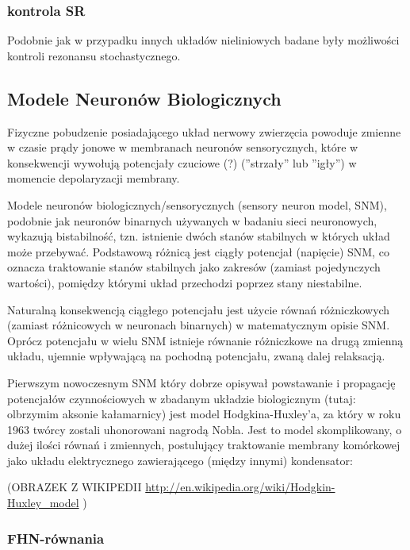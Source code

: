 \documentclass[12pt]{article}
\begin{document}
  \subsubsection{kontrola SR}
  
  Podobnie jak w przypadku innych układów nieliniowych badane były możliwości kontroli rezonansu stochastycznego. \cite{gammaitoni}
  
  \subsection{Modele Neuronów Biologicznych}
  
  Fizyczne pobudzenie posiadającego układ nerwowy zwierzęcia powoduje zmienne w czasie prądy jonowe w membranach neuronów sensorycznych, które w konsekwencji wywołują potencjały czuciowe (?) (''strzały'' lub ''igły'') w momencie depolaryzacji membrany.
  
  Modele neuronów biologicznych/sensorycznych (sensory neuron model, SNM), podobnie jak neuronów binarnych używanych w badaniu sieci neuronowych, wykazują bistabilność, tzn. istnienie dwóch stanów stabilnych w których układ może przebywać. Podstawową różnicą jest ciągły potencjał (napięcie) SNM, co oznacza traktowanie stanów stabilnych jako zakresów (zamiast pojedynczych wartości), pomiędzy którymi układ przechodzi poprzez stany niestabilne. 
  
  Naturalną konsekwencją ciągłego potencjału jest użycie równań różniczkowych (zamiast różnicowych w neuronach binarnych) w matematycznym opisie SNM. Oprócz potencjału w wielu SNM istnieje równanie różniczkowe na drugą zmienną układu, ujemnie wpływającą na pochodną potencjału, zwaną dalej relaksacją.
  
  Pierwszym nowoczesnym SNM który dobrze opisywał powstawanie i propagację potencjałów czynnościowych w zbadanym układzie biologicznym (tutaj: olbrzymim aksonie kałamarnicy) jest model Hodgkina-Huxley'a, za który w roku 1963 twórcy zostali uhonorowani nagrodą Nobla. Jest to model skomplikowany, o dużej ilości równań i zmiennych, postulujący traktowanie membrany komórkowej jako układu elektrycznego zawierającego (między innymi) kondensator:
  
  (OBRAZEK Z WIKIPEDII \url{http://en.wikipedia.org/wiki/Hodgkin-Huxley_model} )

  \subsubsection{FHN-równania}
\end{document}
